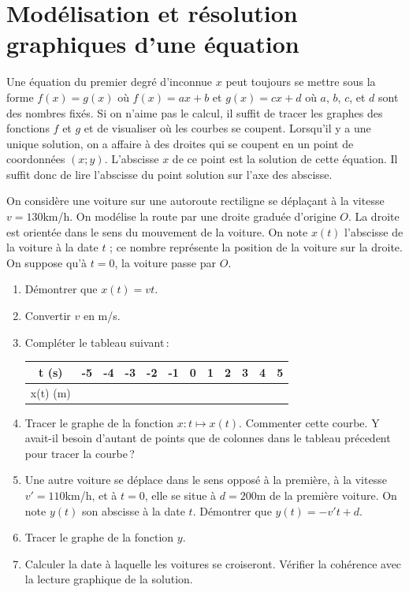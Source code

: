 	\section{Modélisation et résolution graphiques d'une équation}

		Une équation du premier degré d'inconnue $x$ peut toujours se mettre sous la forme $f(x)=g(x)$ où $f(x)=ax+b$ et $g(x)=cx+d$ où $a$, $b$, $c$, et $d$ sont des nombres fixés. Si on n'aime pas le calcul, il suffit de tracer les graphes des fonctions $f$ et $g$ et de visualiser où les courbes se coupent. Lorsqu'il y a une unique solution, on a affaire à des droites qui se coupent en un point de coordonnées $(x;y)$. L'abscisse $x$ de ce point est la solution de cette équation. Il suffit donc de lire l'abscisse du point solution sur l'axe des abscisse.

		\begin{exo}
			On considère une voiture sur une autoroute rectiligne se déplaçant à la vitesse $v=130$km/h. On modélise la route par une droite graduée d'origine $O$. La droite est orientée dans le sens du mouvement de la voiture. On note $x(t)$ l'abscisse de la voiture à la date $t$ ; ce nombre représente la position de la voiture sur la droite. On suppose qu'à $t=0$, la voiture passe par $O$.
			\begin{enumerate}
				\item Démontrer que $x(t)=v t$.
				\item Convertir $v$ en m/s.
				\item Compléter le tableau suivant\,:

				\begin{tabular}{c|c|c|c|c|c|c|c|c|c|c|c}
					t (s) & -5 & -4& -3& -2& -1& 0& 1& 2& 3& 4& 5 \\
					\hline
					x(t) (m)& &   &   &    &   &  &  &  &  &  &  
				\end{tabular}

				\item Tracer le graphe de la fonction $x:t\mapsto x(t)$. Commenter cette courbe. Y avait-il besoin d'autant de points que de colonnes dans le tableau précedent pour tracer la courbe\,?
				\item Une autre voiture se déplace dans le sens opposé à la première, à la vitesse\\ $v'=110$km/h, et à $t=0$, elle se situe à $d=200$m de la première voiture. On note $y(t)$ son abscisse à la date $t$. Démontrer que $y(t)=-v't+d$. 
				\item Tracer le graphe de la fonction $y$. 
				\item Calculer la date à laquelle les voitures se croiseront. Vérifier la cohérence avec la lecture graphique de la solution.


			\end{enumerate}
		\end{exo}

